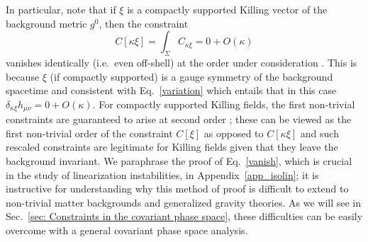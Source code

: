 \documentclass[]{jkpaper}
\theoremstyle{plain}
\theoremstyle{definition}
\begin{document}
In particular, note that if $\xi$ is a compactly supported Killing vector of the background metric $g^0$, then the constraint \begin{equation}\label{vanish}
    C[\kappa\xi]=\int_\Sigma C_{\kappa\xi}=0+O(\kappa)
\end{equation}
vanishes identically (i.e.\ even off-shell) at the order under consideration \cite{fischer1980structure}.  This is because $\xi$ (if compactly supported) is a gauge symmetry of the background spacetime and consistent with Eq.~\eqref{variation} which entails that in this case $\delta_{\kappa\xi}h_{\mu \nu}=0+O(\kappa)$. For compactly supported Killing fields, the first non-trivial constraints are guaranteed to arise at second order \cite{fischer1980structure,Arms:1982ea}; these can be viewed as the first non-trivial order of the constraint $C[\xi]$ as opposed to $C[\kappa\xi]$ and such rescaled constraints are legitimate for Killing fields given that they leave the background invariant. We paraphrase the proof of Eq.~\eqref{vanish}, which is crucial in the study of linearization instabilities, in Appendix~\ref{app_isolin}; it is instructive for understanding why this method of proof is difficult to extend to non-trivial matter backgrounds and generalized gravity theories. As we will see in Sec.~\ref{sec: Constraints in the covariant phase space}, these difficulties can be easily overcome with a general covariant phase space analysis. 
\end{document}
